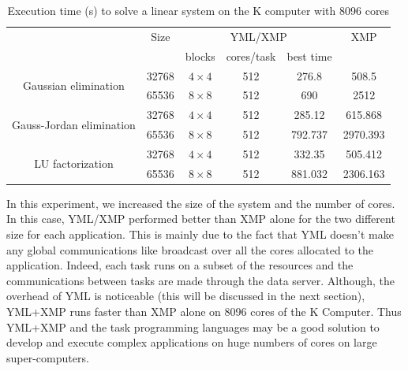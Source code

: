 \begin{table}[h]
	\caption{Execution time (s) to solve a linear system on the K computer with 8096 cores\label{tab:K_8096p}}
	\centering
	\begin{tabular}{cccccc}
		                                          & Size  &      \multicolumn{3}{c}{YML/XMP}      &   XMP    \\
		                                          &       &    blocks    & cores/task & best time &          \\ \hline
		  \multirow{2}{*}{Gaussian elimination}   & 32768 & $4 \times 4$ &    512     &   276.8   &  508.5   \\
		                                          & 65536 & $8 \times 8$ &    512     &    690    &   2512   \\ \hline
		\multirow{2}{*}{Gauss-Jordan elimination} & 32768 & $4 \times 4$ &    512     &  285.12   & 615.868  \\
		                                          & 65536 & $8 \times 8$ &    512     &  792.737  & 2970.393 \\ \hline
		    \multirow{2}{*}{LU factorization}     & 32768 & $4 \times 4$ &    512     &  332.35   & 505.412  \\
		                                          & 65536 & $8 \times 8$ &    512     &  881.032  & 2306.163
	\end{tabular}
\end{table}

In this experiment, we increased the size of the system and the number of cores.
In this case, YML/XMP performed better than XMP alone for the two different size for each application.
This is mainly due to the fact that YML doesn't make any global communications like broadcast over all the cores allocated to the application.
Indeed, each task runs on a subset of the resources and the communications between tasks are made through the data server.
Although, the overhead of YML is noticeable (this will be discussed in the next section), YML+XMP runs faster than XMP alone on 8096 cores of the K Computer.
Thus YML+XMP and the task programming languages may be a good solution to develop and execute complex applications on huge numbers of cores on large super-computers.

